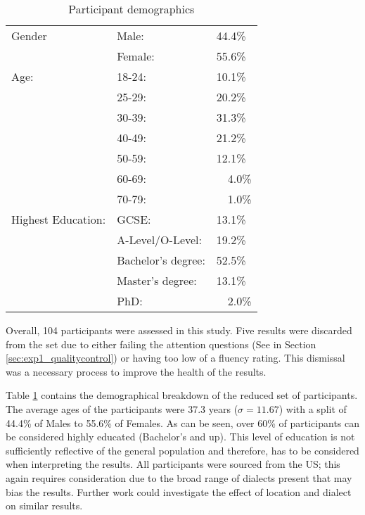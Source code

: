 \begin{table}[h!]
    \centering
    \begin{tabular}{|l|ll|}
        \hline
        Gender & Male: & 44.4\% \\
               & Female: & 55.6\% \\
        \hline
        Age:   & 18-24: & 10.1\% \\
               & 25-29: & 20.2\% \\
               & 30-39: & 31.3\% \\
               & 40-49: & 21.2\% \\
               & 50-59: & 12.1\% \\
               & 60-69: & ~~4.0\% \\ 
               & 70-79: & ~~1.0\% \\ 
               
        \hline
        Highest Education:  
        & GCSE:                 & 13.1\% \\
        & A-Level/O-Level:      & 19.2\% \\
        & Bachelor's degree:    & 52.5\% \\
        & Master's degree:      & 13.1\% \\ 
        & PhD:                  & ~~2.0\%  \\
        \hline

    \end{tabular}
    \caption{Participant demographics}
    \label{tab:exp1_demo}
\end{table}

Overall, 104 participants were assessed in this study. Five results were discarded from the set due to either failing the attention questions (See in Section \ref{sec:exp1_qualitycontrol}) or having too low of a fluency rating. This dismissal was a necessary process to improve the health of the results. 

Table \ref{tab:exp1_demo} contains the demographical breakdown of the reduced set of participants. The average ages of the participants were 37.3 years ($\sigma = 11.67$) with a split of 44.4\% of Males to 55.6\% of Females. As can be seen, over 60\% of participants can be considered highly educated (Bachelor’s and up). This level of education is not sufficiently reflective of the general population and therefore, has to be considered when interpreting the results. All participants were sourced from the US; this again requires consideration due to the broad range of dialects present that may bias the results. Further work could investigate the effect of location and dialect on similar results. 

